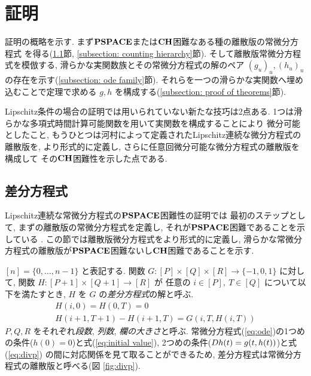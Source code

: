 \section{証明}
\label{section:differentiable}

証明の概略を示す.
まず$\mathbf{PSPACE}$または$\mathbf{CH}$困難なある種の離散版の常微分方程式
を得る(\ref{section:divp}節, \ref{subsection: counting hierarchy}節).
そして離散版常微分方程式を模倣する, 滑らかな実関数族とその常微分方程式の解のペア $(g_u)_u, (h_u)_u$ の存在を示す(\ref{subsection: ode family}節).
それらを一つの滑らかな実関数へ埋め込むことで定理で求める $g, h$ を構成する(\ref{subsection: proof of theorems}節).

Lipschitz条件の場合の証明では用いられていない新たな技巧は2点ある.
1つは滑らかな多項式時間計算可能関数を用いて実関数を構成することにより
微分可能としたこと,
もうひとつは河村によって定義されたLipschitz連続な微分方程式の離散版を,
より形式的に定義し, さらに任意回微分可能な微分方程式の離散版を構成して
その$\mathbf{CH}$困難性を示した点である.



\subsection{差分方程式}
\label{section:divp}

Lipschitz連続な常微分方程式の$\mathbf{PSPACE}$困難性の証明では
最初のステップとして, まずの離散版の常微分方程式を定義し, 
それが$\mathbf{PSPACE}$困難であることを示している
\cite[補題4.7]{kawamura2010lipschitz}.
この節では離散版微分方程式をより形式的に定義し,
滑らかな常微分方程式の離散版が$\mathbf{PSPACE}$困難ないし$\mathbf{CH}$困難であることを示す.

$[n] = \{0, \dots , n-1\}$ と表記する.
関数 $G \colon [P] \times [Q] \times [R] \to \{-1, 0, 1\}$ に対して,
関数 $H \colon [P + 1] \times [Q+1] \to [R]$ が
任意の $i \in [P],\ T \in [Q]$ について以下を満たすとき,
$H$ を $G$ の\emph{差分方程式}の解と呼ぶ.
\begin{gather}
   H(i, 0) = H(0, T) = 0 \label{eq:initial value}
\\
   H(i + 1, T + 1) - H(i+1, T) = G(i, T, H(i, T))  \label{eq:divp}
\end{gather}
$P, Q, R$ をそれぞれ\emph{段数}, \emph{列数}, \emph{欄の大きさ}と呼ぶ.
常微分方程式(\ref{eq:ode})の1つめの条件($h(0) = 0$)と式(\ref{eq:initial value}),
2つめの条件($D h(t) = g(t, h(t))$)と式(\ref{eq:divp})
の間に対応関係を見て取ることができるため,
差分方程式は常微分方程式の離散版と呼べる(図 \ref{fig:divp}).

